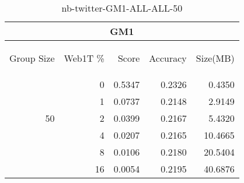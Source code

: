 \begin{center}
\begin{table}[htbp] 
 \begin{center}
\begin{tabular}{ | r | r | r | r | r |}
\hline
\multicolumn{5}{|c|}{GM1}\\
\hline
\begin{sideways}Group Size\end{sideways} & \begin{sideways}Web1T \%\end{sideways} & \begin{sideways}Score\end{sideways} & \begin{sideways}Accuracy\end{sideways} & \begin{sideways}Size(MB)\end{sideways}\\
\hline
\multirow{5}{*}{50}
 & 0 & 0.5347 & 0.2326 & 0.4350\\ \cline{2-5}
 & 1 & 0.0737 & 0.2148 & 2.9149\\ \cline{2-5}
 & 2 & 0.0399 & 0.2167 & 5.4320\\ \cline{2-5}
 & 4 & 0.0207 & 0.2165 & 10.4665\\ \cline{2-5}
 & 8 & 0.0106 & 0.2180 & 20.5404\\ \cline{2-5}
 & 16 & 0.0054 & 0.2195 & 40.6876\\ \cline{2-5}
\hline
\end{tabular}
\caption{nb-twitter-GM1-ALL-ALL-50}
\label{table:nb-twitter-GM1-ALL-ALL-50}
\end{center}
 \end{table}
\end{center}

